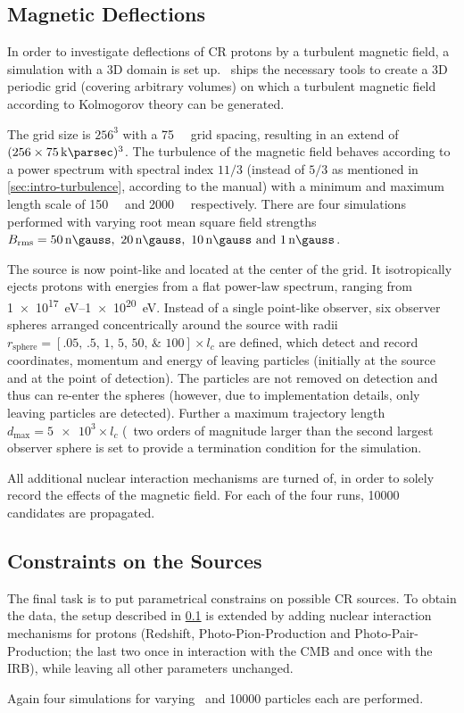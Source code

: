 \subsection{Magnetic Deflections}
\label{sec:setup-defl}
In order to investigate deflections of CR protons by a turbulent
magnetic field, a simulation with a 3D domain is set up. \CRPropa~ships the
necessary tools to create a 3D periodic grid (covering arbitrary volumes) on
which a turbulent magnetic field according to Kolmogorov theory can be
generated.

The grid size is $256^3$ with a \SI{75}{\kilo\parsec} grid spacing, resulting
in an extend of $(256\times\SI{75}{\kilo\parsec})^3$. The turbulence of the
magnetic field behaves according to a power spectrum with spectral index
$11/3$ (instead of $5/3$ as mentioned in \cref{sec:intro-turbulence},
according to the manual) with a minimum and maximum length scale of
\SI{150}{\kilo\parsec} and \SI{2000}{\kilo\parsec} respectively.
There are four simulations performed with varying root mean square field
strengths $\Brms=\SIlist{50;20;10;1}{\nano\gauss}$.

The source is now point-like and located at the center of the grid. It
isotropically ejects protons with energies from a flat power-law spectrum,
ranging from \SIrange{1e17}{1e20}{\electronvolt}. Instead of a single
point-like observer, six observer spheres arranged concentrically around the
source with radii
$r_{\mathrm{sphere}}=[\numlist[list-final-separator={,}]{.05;.5;1;5;50;100}]\times
l_c$ are defined, which detect and record coordinates, momentum and
energy of leaving particles (initially at the source and at the point of
detection). The particles are not removed on detection and
thus can re-enter the spheres (however, due to implementation details, only
leaving particles are detected). Further a maximum trajectory length
$d_{\mathrm{max}}=\num{5e3}\times l_c$ (\ie~two orders of magnitude larger than
the second largest observer sphere is set to provide a termination condition
for the simulation.

All additional nuclear interaction mechanisms are turned of, in order to solely
record the effects of the magnetic field.
For each of the four runs, \num{10000} candidates are propagated.


\subsection{Constraints on the Sources}
The final task is to put parametrical constrains on possible CR sources. To
obtain the data, the setup described in \cref{sec:setup-defl} is extended by
adding nuclear interaction mechanisms for protons (Redshift,
Photo-Pion-Production and Photo-Pair-Production; the last two once in
interaction with the CMB and once with the IRB), while leaving all other
parameters unchanged.

Again four simulations for varying \Brms~and \num{10000} particles each are
performed.


